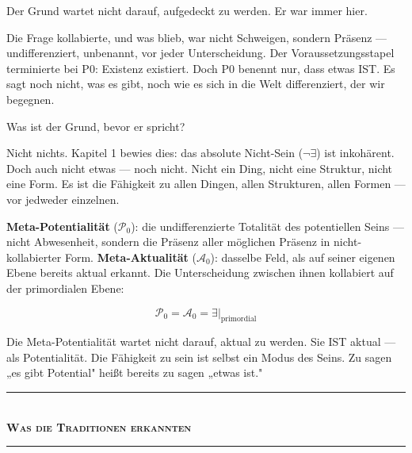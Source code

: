 \documentclass[10pt, openany, oneside]{book}
\renewcommand{\normalsize}{\fontsize{10}{13}\selectfont}
\begin{document}
\vspace{2em}


\noindent Der Grund wartet nicht darauf, aufgedeckt zu werden. Er war immer hier.

Die Frage kollabierte, und was blieb, war nicht Schweigen, sondern Präsenz --- undifferenziert, unbenannt, vor jeder Unterscheidung. Der Voraussetzungsstapel terminierte bei P0: Existenz existiert. Doch P0 benennt nur, dass etwas IST. Es sagt noch nicht, was es gibt, noch wie es sich in die Welt differenziert, der wir begegnen.

Was ist der Grund, bevor er spricht?

Nicht nichts. Kapitel 1 bewies dies: das absolute Nicht-Sein ($\neg\exists$) ist inkohärent. Doch auch nicht etwas --- noch nicht. Nicht ein Ding, nicht eine Struktur, nicht eine Form. Es ist die Fähigkeit zu allen Dingen, allen Strukturen, allen Formen --- vor jedweder einzelnen.

\textbf{Meta-Potentialität} ($\mathcal{P}_0$): die undifferenzierte Totalität des potentiellen Seins --- nicht Abwesenheit, sondern die Präsenz aller möglichen Präsenz in nicht-kollabierter Form. \textbf{Meta-Aktualität} ($\mathcal{A}_0$): dasselbe Feld, als auf seiner eigenen Ebene bereits aktual erkannt. Die Unterscheidung zwischen ihnen kollabiert auf der primordialen Ebene:

$$\mathcal{P}_0 = \mathcal{A}_0 = \exists|_{\text{primordial}}$$

Die Meta-Potentialität wartet nicht darauf, aktual zu werden. Sie IST aktual --- als Potentialität. Die Fähigkeit zu sein ist selbst ein Modus des Seins. Zu sagen „es gibt Potential" heißt bereits zu sagen „etwas ist."

\vspace{1.5em}


\begin{center}
    \rule{0.3\textwidth}{0.4pt}\\[0.5em]
    {\normalsize\bfseries\scshape Was die Traditionen erkannten}\\[0.3em]
    \rule{0.3\textwidth}{0.4pt}
\end{center}
\end{document}
